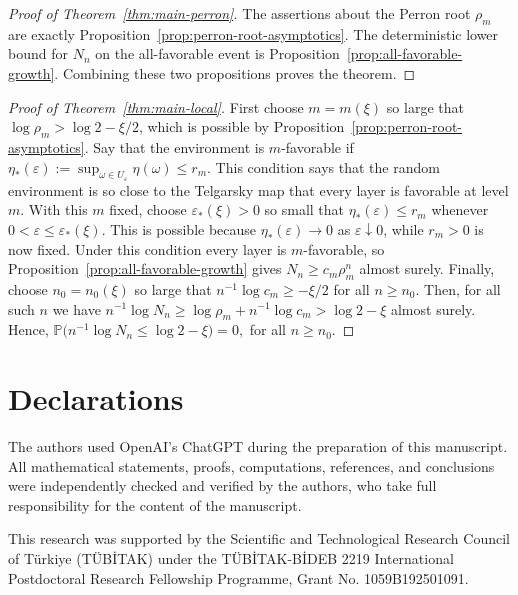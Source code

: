 \documentclass[11pt]{amsart}
\numberwithin{equation}{section}
\theoremstyle{plain}
\theoremstyle{definition}
\theoremstyle{remark}
\begin{document}
\begin{proof}[Proof of Theorem~\ref{thm:main-perron}]
The assertions about the Perron root \(\rho_m\) are exactly Proposition~\ref{prop:perron-root-asymptotics}. The deterministic lower bound for \(N_n\) on the all-favorable event is Proposition~\ref{prop:all-favorable-growth}. Combining these two propositions proves the theorem.
\end{proof}










\begin{proof}[Proof of Theorem~\ref{thm:main-local}]
First choose \(m=m(\xi)\) so large that \(\log\rho_m>\log 2-\xi/2\), which is possible by Proposition~\ref{prop:perron-root-asymptotics}. 
Say that the environment is \(m\)-favorable if
\(
	\eta_*(\varepsilon):=\sup_{\omega\in U_{\varepsilon}} \eta(\omega)\le r_m .
\)
This condition says that the random environment is so close to the Telgarsky map
that every layer is favorable at level \(m\). 	With this \(m\) fixed, choose \(\varepsilon_\ast(\xi)>0\) so small that \(\eta_\ast(\varepsilon)\le r_m\) whenever \(0<\varepsilon\le\varepsilon_\ast(\xi)\). This is possible because \(\eta_\ast(\varepsilon)\to0\) as \(\varepsilon\downarrow0\), while \(r_m>0\) is now fixed.
Under this condition every layer is \(m\)-favorable, so Proposition~\ref{prop:all-favorable-growth} gives \(N_n\ge c_m\rho_m^n\) almost surely. Finally, choose \(n_0=n_0(\xi)\) so large that \(n^{-1}\log c_m\ge-\xi/2\) for all \(n\ge n_0\). Then, for all such \(n\) we have
\(
n^{-1}\log N_n
\ge \log\rho_m+n^{-1}\log c_m
> \log 2-\xi
\)
almost surely. Hence,
\(
\mathbb P\bigl(n^{-1}\log N_n\le \log 2-\xi\bigr)=0,
\)
for all \(n\ge n_0\).
\end{proof}



\section*{Declarations}
 The authors used OpenAI's ChatGPT during the preparation of this manuscript. All mathematical statements, proofs, computations, references, and conclusions were independently checked and verified by the authors, who take full responsibility for the content of the manuscript.

\medskip

 This research was supported by the Scientific and Technological Research Council of Türkiye (TÜBİTAK) under the TÜBİTAK-BİDEB 2219 International Postdoctoral Research Fellowship Programme, Grant No. 1059B192501091.
\medskip
\end{document}

